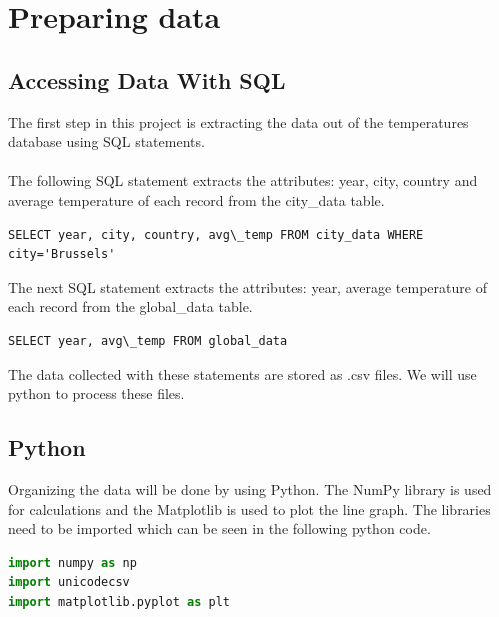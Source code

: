 \documentclass{article}
\begin{document}
\maketitle
{}

\newpage


\section{Preparing data}

\subsection{Accessing Data With SQL}

The first step in this project is extracting the data out of the temperatures database using SQL statements.
\paragraph{}The following SQL statement extracts the attributes: year, city, country and average temperature of each record from the city\_data table. 
\begin{verbatim}
SELECT year, city, country, avg\_temp FROM city_data WHERE city='Brussels'
\end{verbatim}

The next SQL statement extracts the attributes: year, average temperature of each record from the global\_data table.
\begin{verbatim}
SELECT year, avg\_temp FROM global_data
\end{verbatim}

The data collected with these statements are stored as .csv files. We will use python to process these files.

\subsection{Python}

Organizing the data will be done by using Python. The NumPy library is used for calculations and the Matplotlib is used to plot the line graph. The libraries need to be imported which can be seen in the following python code.
\lstset{basicstyle=\footnotesize}
\begin{lstlisting}[language=Python]
import numpy as np 
import unicodecsv
import matplotlib.pyplot as plt
\end{lstlisting}
\end{document}
